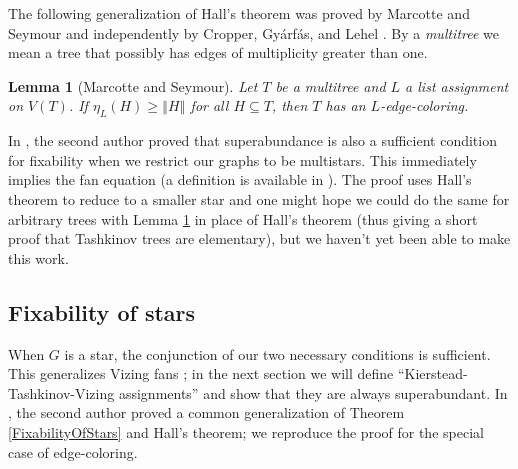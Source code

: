 \documentclass[12pt]{article}
\theoremstyle{plain}
\newtheorem{lem}[thm]{Lemma}
\theoremstyle{definition}
\theoremstyle{remark}
\newcommand{\size}[1]{\left\Vert#1\right\Vert}
\begin{document}
The following generalization of Hall's theorem was proved by Marcotte and
Seymour \cite{marcotte1990extending} and independently by Cropper,
Gy{\'a}rf{\'a}s, and Lehel \cite{cropper2003edge}.  By a \emph{multitree} we
mean a tree that possibly has edges of multiplicity greater than one.

\begin{lem}[Marcotte and Seymour]\label{MultiTreeHall}
Let $T$ be a multitree and $L$ a list assignment on $V(T)$.  If $\eta_L(H) \ge \size{H}$ for all $H \subseteq T$, then $T$ has an $L$-edge-coloring.
\end{lem}

In \cite{HallGame}, the second author proved that superabundance is also a
sufficient condition for fixability when we restrict our graphs to be
multistars.  This immediately implies the fan equation (a definition is
available in \cite[p. 19ff]{stiebitz2012graph}).  The proof uses Hall's theorem
to reduce to a smaller star and one might hope we could do the same for
arbitrary trees with Lemma \ref{MultiTreeHall} in place of Hall's theorem (thus
giving a short proof that Tashkinov trees are elementary), but we haven't yet
been able to make this work.

\subsection{Fixability of stars}
When $G$ is a star, the conjunction of our two necessary conditions is sufficient. This generalizes Vizing fans \cite{Vizing76}; in the next section we will define ``Kierstead-Tashkinov-Vizing assignments'' and show that they are always superabundant.  In \cite{HallGame}, the second author proved a common generalization of Theorem \ref{FixabilityOfStars} and Hall's theorem; we reproduce the proof for the special case of edge-coloring.
\end{document}

